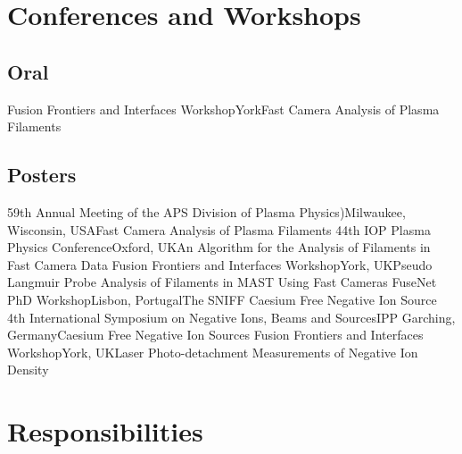 \documentclass[11pt,a4paper,sans]{moderncv}        %
\begin{document}

\section{Conferences and Workshops}
\subsection{Oral}
{Fusion Frontiers and Interfaces Workshop}{York}{\newline Fast Camera Analysis of Plasma Filaments}{}{}
\subsection{Posters}
{59th Annual Meeting of the APS Division of Plasma Physics)}{\newline Milwaukee, Wisconsin, USA}{\newline Fast Camera Analysis of Plasma Filaments}{}
{}
{44th IOP Plasma Physics Conference}{Oxford, UK}{\newline An Algorithm for the Analysis of Filaments in Fast Camera Data}{}
{}
{Fusion Frontiers and Interfaces Workshop}{York, UK}{\newline Pseudo Langmuir Probe Analysis  of Filaments in MAST Using Fast Cameras}{}
{}
{FuseNet PhD Workshop}{Lisbon, Portugal}{\newline The SNIFF Caesium Free Negative Ion Source}{}
{}
{4th International Symposium on Negative Ions, Beams and Sources}{IPP Garching, Germany}{\newline Caesium Free Negative Ion Sources}{}
{}
{Fusion Frontiers and Interfaces Workshop}{York, UK}{\newline Laser Photo-detachment Measurements of Negative Ion Density}{}
{}

\section{Responsibilities}
\end{document}
